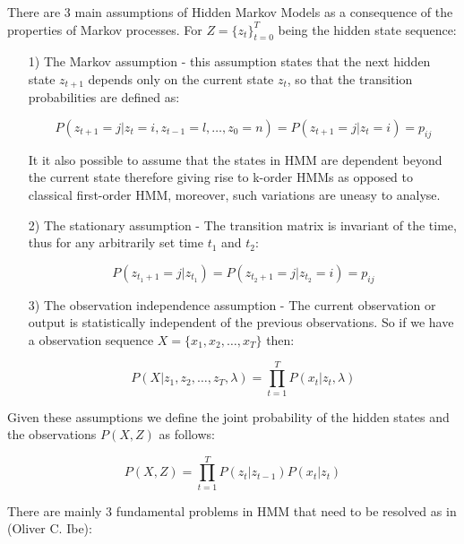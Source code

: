 There are 3 main assumptions of Hidden Markov Models as a consequence of the properties of Markov processes. For $Z = \{z_t\}_{t=0}^T$ being the hidden state sequence:

\begin{itemize}
\item[1)] The Markov assumption - this assumption states that the next hidden state $z_{t+1}$ depends only on the current state $z_t$, so that the transition probabilities are defined as:

\begin{equation}
P(z_{t+1} = j| z_{t} = i,z_{t-1} = l,\ldots,z_{0} = n) = P(z_{t+1} = j| z_{t} = i) = p_{ij}
\end{equation}

It it also possible to assume that the states in HMM are dependent beyond the current state therefore giving rise to k-order HMMs as opposed to classical first-order HMM, moreover, such variations are uneasy to analyse.

\item[2)] The stationary assumption - The transition matrix is invariant of the time, thus for any arbitrarily set time $t_1$ and $t_2$:

\begin{equation}
P(z_{t_1+1} = j| z_{t_1}) = P(z_{t_2+1} = j| z_{t_2} = i) = p_{ij}
\end{equation}

\item[3)] The observation independence assumption - The current observation or output is statistically independent of the previous observations. So if we have a observation sequence $X = \{x_1,x_2,\ldots,x_T\}$ then:

\begin{equation}
P(X|z_1,z_2,\ldots,z_T, \lambda) = \prod_{t=1}^T P(x_t|z_t,\lambda)
\end{equation}

\end{itemize}

Given these assumptions we define the joint probability of the hidden states and the observations $P(X,Z)$ as follows:

\begin{equation}
P(X, Z) = \prod_{t=1}^T P(z_t|z_{t-1}) P(x_t|z_t)
\end{equation}



There are mainly 3 fundamental problems in HMM that need to be resolved as in (Oliver C. Ibe):

